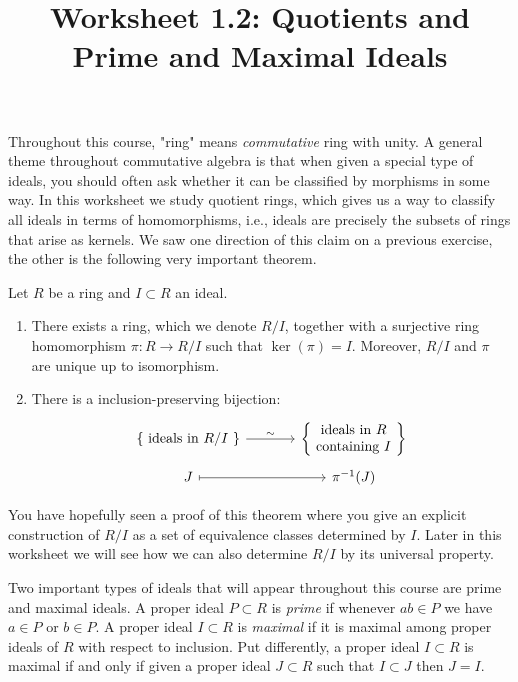 \documentclass[12pt,reqno]{amsart}
\title{Worksheet 1.2: Quotients and Prime and Maximal Ideals}
\begin{document}

\maketitle
\thispagestyle{firstpageIP}

Throughout this course, "ring" means  \textit{commutative} ring with unity. A general theme throughout commutative algebra is that when given a special type of ideals, you should often ask whether it can be classified by morphisms in some way. In this worksheet we study quotient rings, which gives us a way to classify all ideals in terms of homomorphisms, i.e., ideals are precisely the subsets of rings that arise as kernels. We saw one direction of this claim on a previous exercise, the other is the following very important theorem. 

\begin{theorem}
	Let $R$ be a ring and $I \subset R$ an ideal. 
	\begin{enumerate}[(1)]
		\item There exists a ring, which we denote $R/I$, together with a surjective ring homomorphism $\pi:R \to R/I$ such that $\ker(\pi) = I$. Moreover, $R/I$ and $\pi$ are unique up to isomorphism. 
		\item There is a inclusion-preserving bijection:
		\[
		\begin{tikzcd}[row sep = .3em, column sep = 3.5em]
		\left\{ \text{ ideals in $R/I$ } \right\} \arrow[r, "\sim"] & \left\{ \begin{matrix} \text{ ideals in $R$ } \\ \text{ containing $I$ }\end{matrix}\right\} \\
		J \arrow[r, mapsto] & \pi^{-1}(J)
		\end{tikzcd}
		\]
	\end{enumerate}
\end{theorem}

You have hopefully seen a proof of this theorem where you give an explicit construction of $R/I$ as a set of equivalence classes determined by $I$. Later in this worksheet we will see how we can also determine $R/I$ by its universal property. 

Two important types of ideals that will appear throughout this course are prime and maximal ideals. A proper ideal $P \subset R$ is \emph{prime} if whenever $ab \in P$ we have $a \in P$ or $b \in P$.  A proper ideal $I \subset R$ is \emph{maximal} if it is maximal among proper ideals of $R$ with respect to inclusion. Put differently, a proper ideal $I \subset R$ is maximal if and only if given a proper ideal $J \subset R$ such that  $I \subset J$ then $J=I$. 
\end{document}
